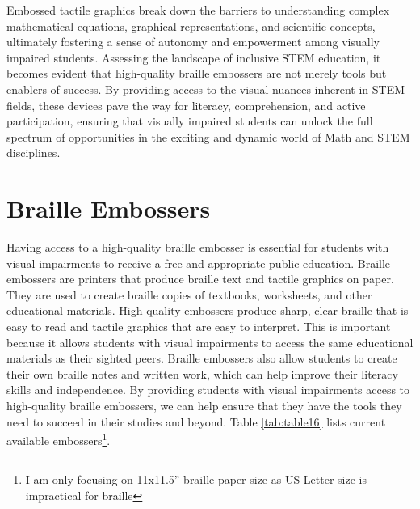 \documentclass[12pt,letterpaper,twoside,openright]{report}
\begin{document}
Embossed tactile graphics break down the barriers to understanding complex mathematical equations, graphical representations, and scientific concepts, ultimately fostering a sense of autonomy and empowerment among visually impaired students. Assessing the landscape of inclusive STEM education, it becomes evident that high-quality braille embossers are not merely tools but enablers of success. By providing access to the visual nuances inherent in STEM fields, these devices pave the way for literacy, comprehension, and active participation, ensuring that visually impaired students can unlock the full spectrum of opportunities in the exciting and dynamic world of Math and STEM disciplines.


\pagebreak\hypertarget{embossers}{}\section{Braille Embossers}\label{embossers}
Having access to a high-quality braille embosser is essential for students with visual impairments to receive a free and appropriate public education. Braille embossers are printers that produce braille text and tactile graphics on paper. They are used to create braille copies of textbooks, worksheets, and other educational materials. High-quality embossers produce sharp, clear braille that is easy to read and tactile graphics that are easy to interpret. This is important because it allows students with visual impairments to access the same educational materials as their sighted peers. Braille embossers also allow students to create their own braille notes and written work, which can help improve their literacy skills and independence. By providing students with visual impairments access to high-quality braille embossers, we can help ensure that they have the tools they need to succeed in their studies and beyond. Table \ref{tab:table16} lists current available embossers\footnote{\raggedright I am only focusing on 11x11.5'' braille paper size as US Letter size is impractical for braille}.
\end{document}
